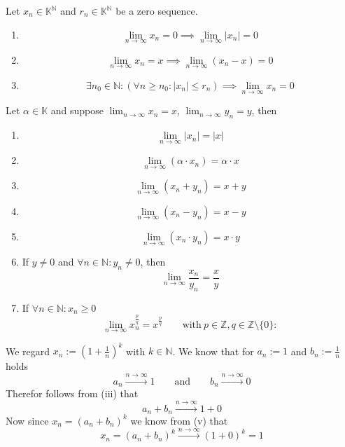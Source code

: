 \begin{lemma}\label{lem:zero_seq}
   Let \(x_n \in \mathbb{K}^\mathbb{N}\) and \(r_n \in \mathbb{K}^\mathbb{N}\) be a zero sequence.
   \begin{enumerate}[label=\roman*, align=Center]
      \item \[\lim_{n \to \infty} x_n = 0 \implies \lim_{n \to \infty} \lvert x_n\rvert = 0\]
      \item \[\lim_{n \to \infty} x_n = x \implies \lim_{n \to \infty} (x_n - x) = 0\]
      \item \[\exists n_0 \in \mathbb{N}: (\forall n \geq n_0: |x_n| \leq r_n) \implies \lim_{n \to \infty} x_n = 0\]
   \end{enumerate}
\end{lemma}

\begin{proposition}
   Let \(\alpha \in \mathbb{K}\) and suppose \(\lim_{n \to \infty} x_n = x\), \(\lim_{n \to \infty} y_n = y\), then
   \begin{enumerate}[label=\roman*, align=Center]
      \item \[\lim_{n \to \infty} \lvert x_n\rvert = \lvert x \rvert\]
      \item \[\lim_{n \to \infty} (\alpha \cdot x_n) = \alpha \cdot x\]
      \item \[\lim_{n \to \infty} (x_n + y_n) = x + y\]
      \item \[\lim_{n \to \infty} (x_n - y_n) = x - y\]
      \item \[\lim_{n \to \infty} (x_n \cdot y_n) = x \cdot y\]
      \item If \(y \neq 0\) and \(\forall n \in \mathbb{N}: y_n \neq 0\), then
         \[\lim_{n \to \infty} \frac{x_n}{y_n} = \frac{x}{y}\]
      \item If \(\forall n \in \mathbb{N}: x_n \geq 0\)
         \[\lim_{n \to \infty} x_n^{\frac{p}{q}} = x^{\frac{p}{q}} \qquad\text{with}~p \in \mathbb{Z}, q \in \mathbb{Z} \setminus \{0\}: \]
   \end{enumerate}
\end{proposition}
\begin{example}
   We regard \(x_n := \left(1 + \frac{1}{n}\right)^k\) with \(k \in \mathbb{N}\).
   We know that for \(a_n := 1\) and \(b_n := \frac{1}{n}\) holds
   \[a_n \xrightarrow{n \to \infty} 1 \qquad\text{and}\qquad b_n \xrightarrow{n \to \infty} 0\]
   Therefor follows from (iii) that
   \[a_n + b_n \xrightarrow{n \to \infty} 1 + 0\]
   Now since \(x_n = (a_n + b_n)^k\) we know from (v) that
   \[x_n = (a_n + b_n)^k \xrightarrow{n \to \infty} (1+0)^k = 1\]
\end{example}


